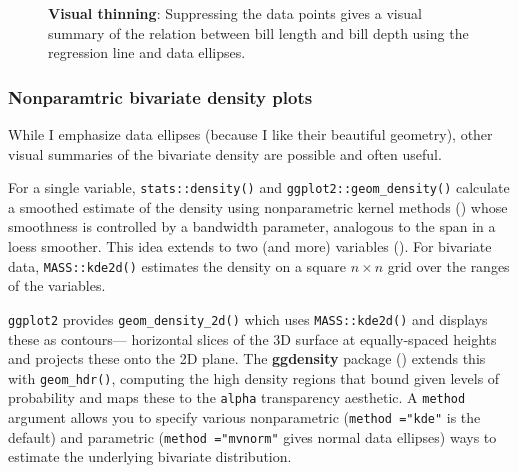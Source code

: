 \documentclass[
  letterpaper,
  10pt,
  krantz2]{krantz}
\begin{document}
\begin{figure}[H]


\caption{\label{fig-peng-ggplot2}\textbf{Visual thinning}: Suppressing
the data points gives a visual summary of the relation between bill
length and bill depth using the regression line and data ellipses.}

\end{figure}%

\subsubsection{Nonparamtric bivariate density
plots}\label{nonparamtric-bivariate-density-plots}

While I emphasize data ellipses (because I like their beautiful
geometry), other visual summaries of the bivariate density are possible
and often useful.

For a single variable, \texttt{stats::density()} and
\texttt{ggplot2::geom\_density()} calculate a smoothed estimate of the
density using nonparametric kernel methods
() whose smoothness is
controlled by a bandwidth parameter, analogous to the span in a loess
smoother. This idea extends to two (and more) variables
(). For bivariate data,
\texttt{MASS::kde2d()} estimates the density on a square \(n \times n\)
grid over the ranges of the variables.

\texttt{ggplot2} provides \texttt{geom\_density\_2d()} which uses
\texttt{MASS::kde2d()} and displays these as contours--- horizontal
slices of the 3D surface at equally-spaced heights and projects these
onto the 2D plane. The \textbf{ggdensity} package
() extends this with
\texttt{geom\_hdr()}, computing the high density regions that bound
given levels of probability and maps these to the \texttt{alpha}
transparency aesthetic. A \texttt{method} argument allows you to specify
various nonparametric (\texttt{method\ ="kde"} is the default) and
parametric (\texttt{method\ ="mvnorm"} gives normal data ellipses) ways
to estimate the underlying bivariate distribution.
\end{document}
